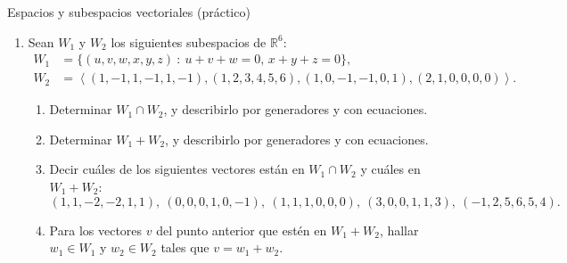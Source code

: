 \begin{chapter}{Espacios y subespacios vectoriales (práctico)}
\begin{enumerate}[resume, topsep=6pt, itemsep=.4cm]
\item\label{todo} Sean $W_1$ y $W_2$ los siguientes subespacios de $\mathbb{R}^6$:
    \begin{align*}
    W_1 &= \{ (u,v,w,x,y,z)\ : \ u+v+w=0,\, x+y+z=0\},  \\
    W_2 &= \left\langle{(1,-1,1,-1,1,-1),(1,2,3,4,5,6),(1,0,-1,-1,0,1),(2,1,0,0,0,0)}\right\rangle.
    \end{align*}
    \begin{enumerate}
        \item  Determinar $W_1 \cap W_2$, y describirlo por generadores y con ecuaciones.
        \item  Determinar $W_1+W_2$, y describirlo por generadores y con ecuaciones.
        \item  Decir cuáles de los siguientes vectores están en $W_1\cap W_2$ y cuáles en $W_1+W_2$:
        \[ (1,1,-2,-2,1,1),\ (0,0,0,1,0,-1),\ (1,1,1,0,0,0),\ (3,0,0,1,1,3),\ (-1,2,5,6,5,4). \]
        \item Para los vectores $v$ del punto anterior que estén en $W_1+W_2$,  hallar $w_1\in W_1$ y $w_2\in W_2$ tales que $v=w_1+w_2$.

    \end{enumerate}


\end{enumerate}

%
%
%
%
%
%         
%


\end{chapter}
